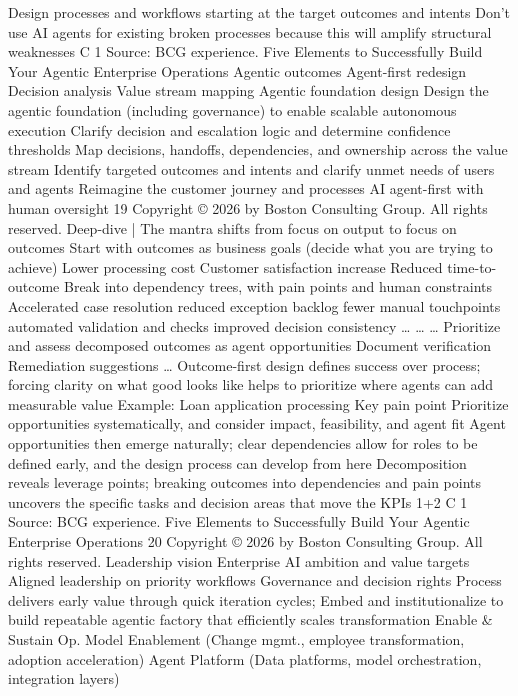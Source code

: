 Design processes and workflows starting at the target outcomes and intents
Don't use AI agents for existing
broken processes because this will
amplify structural weaknesses
C
1
Source: BCG experience.
Five Elements to Successfully Build Your Agentic Enterprise Operations
Agentic
outcomes
Agent-first
redesign
Decision
analysis
Value stream
mapping
Agentic foundation
design
Design the agentic
foundation (including
governance) to enable
scalable autonomous
execution
Clarify decision and
escalation logic
and determine
confidence
thresholds
Map decisions,
handoffs,
dependencies, and
ownership across
the value stream
Identify targeted
outcomes and
intents and clarify
unmet needs of
users and agents
Reimagine the
customer journey
and processes AI
agent-first with
human oversight
19
Copyright © 2026 by Boston Consulting Group. All rights reserved.
Deep-dive | The mantra shifts from focus on output to focus on outcomes
Start with outcomes as business goals (decide what you are trying to achieve)
Lower processing cost
Customer satisfaction
increase
Reduced time-to-
outcome
Break into dependency trees, with pain points and human constraints
Accelerated
case resolution
reduced
exception backlog
fewer
manual touchpoints
automated validation
and checks
improved decision
consistency
…
…
…
Prioritize and assess decomposed outcomes as agent opportunities
Document verification
Remediation suggestions
…
Outcome-first design defines success over process;
forcing clarity on what good looks like helps to prioritize
where agents can add measurable value
Example: Loan application processing
Key pain point
Prioritize opportunities systematically,
and consider impact, feasibility, and agent fit
Agent opportunities then emerge naturally; clear
dependencies allow for roles to be defined early,
and the design process can develop from here
Decomposition reveals leverage points; breaking
outcomes into dependencies and pain points uncovers
the specific tasks and decision areas that move the KPIs
1+2
C
1
Source: BCG experience.
Five Elements to Successfully Build Your Agentic Enterprise Operations
20
Copyright © 2026 by Boston Consulting Group. All rights reserved.
Leadership
vision
Enterprise AI
ambition and value
targets
Aligned leadership
on priority workflows
Governance and
decision rights
Process delivers early value through quick iteration cycles; Embed and institutionalize to
build repeatable agentic factory that efficiently scales transformation
Enable \&
Sustain
Op. Model Enablement (Change mgmt., employee transformation, adoption acceleration)
Agent Platform  (Data platforms, model orchestration, integration layers)
